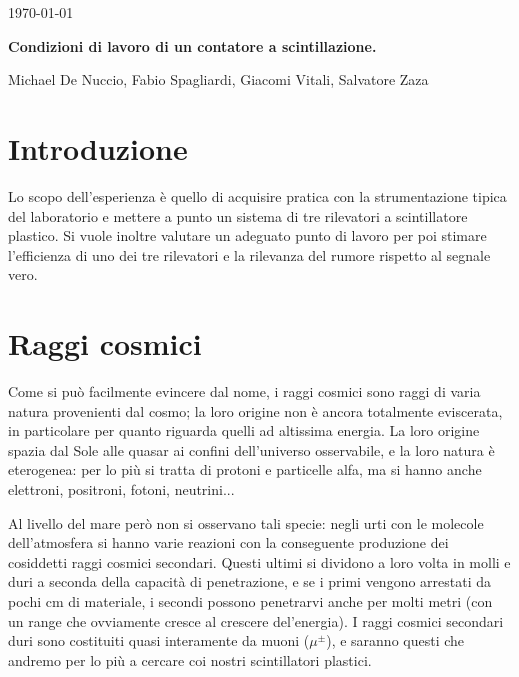\documentclass[a4paper,10pt]{article}
\begin{document}
\begin{flushright}             
\today
\end{flushright} 

\begin{center}
\Large{\bf Condizioni di lavoro di un contatore a scintillazione. }

\vspace*{1cm}                                 
\large{Michael De Nuccio, Fabio Spagliardi, Giacomi Vitali, Salvatore Zaza }\\ 
\vspace*{0.5cm}       
\vspace*{1.cm}
\end{center}



\section{Introduzione}
\label{sec:intro} 
Lo scopo dell'esperienza è quello di acquisire pratica con la strumentazione tipica del laboratorio e mettere a punto un sistema di tre rilevatori a scintillatore plastico. Si vuole inoltre valutare un adeguato punto di lavoro per poi stimare l'efficienza di uno dei tre rilevatori e la rilevanza del rumore rispetto al segnale vero.

\section{Raggi cosmici}
Come si può facilmente evincere dal nome, i raggi cosmici sono raggi di varia natura provenienti dal cosmo; la loro origine non è ancora totalmente eviscerata, in particolare per quanto riguarda quelli ad altissima energia. La loro origine spazia dal Sole alle quasar ai confini dell'universo osservabile, e la loro natura è eterogenea: per lo più si tratta di protoni e particelle alfa, ma si hanno anche elettroni, positroni, fotoni, neutrini...

Al livello del mare però non si osservano tali specie: negli urti con le molecole dell'atmosfera si hanno varie reazioni con la conseguente produzione dei cosiddetti raggi cosmici secondari. Questi ultimi si dividono a loro volta in molli e duri a seconda della capacità di penetrazione, e se i primi vengono arrestati da pochi cm di materiale, i secondi possono penetrarvi anche per molti metri (con un range che ovviamente cresce al crescere del'energia).
I raggi cosmici secondari duri sono costituiti quasi interamente da muoni ($\mu^{\pm}$), e saranno questi che andremo per lo più a cercare coi nostri scintillatori plastici.
\end{document}
